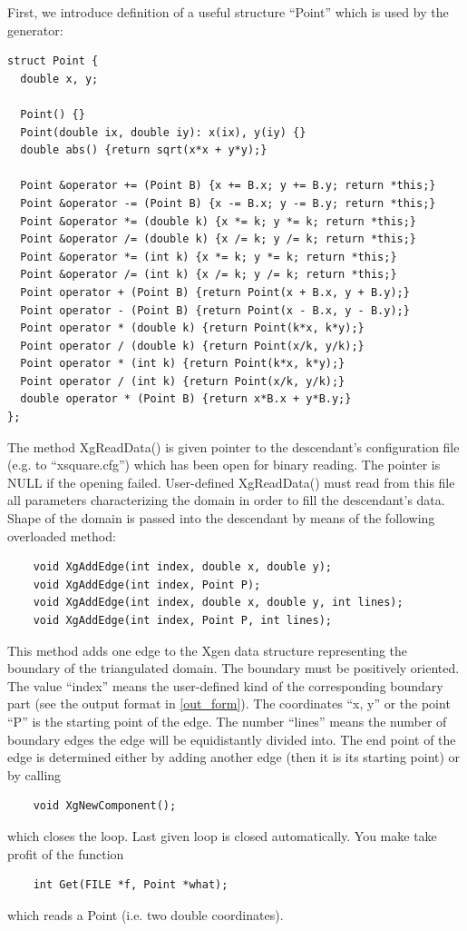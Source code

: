 \documentclass[12pt]{article}
\begin{document}
  First, we introduce definition of a useful structure ``Point'' which is
  used by the generator:
  \begin{verbatim}
struct Point {
  double x, y;

  Point() {}
  Point(double ix, double iy): x(ix), y(iy) {}
  double abs() {return sqrt(x*x + y*y);}

  Point &operator += (Point B) {x += B.x; y += B.y; return *this;}
  Point &operator -= (Point B) {x -= B.x; y -= B.y; return *this;}
  Point &operator *= (double k) {x *= k; y *= k; return *this;}
  Point &operator /= (double k) {x /= k; y /= k; return *this;}
  Point &operator *= (int k) {x *= k; y *= k; return *this;}
  Point &operator /= (int k) {x /= k; y /= k; return *this;}
  Point operator + (Point B) {return Point(x + B.x, y + B.y);}
  Point operator - (Point B) {return Point(x - B.x, y - B.y);}
  Point operator * (double k) {return Point(k*x, k*y);}
  Point operator / (double k) {return Point(x/k, y/k);}
  Point operator * (int k) {return Point(k*x, k*y);}
  Point operator / (int k) {return Point(x/k, y/k);}
  double operator * (Point B) {return x*B.x + y*B.y;}
};
  \end{verbatim}  
  The method XgReadData() is given pointer to the descendant's configuration
  file (e.g. to ``xsquare.cfg'') which has been open for binary reading. The pointer
  is NULL if the opening failed. User-defined XgReadData() must read from this
  file all parameters characterizing the domain in order to fill the descendant's 
  data. Shape of the domain is passed into the descendant by means of the following
  overloaded method:
  \begin{verbatim}
    void XgAddEdge(int index, double x, double y);
    void XgAddEdge(int index, Point P);
    void XgAddEdge(int index, double x, double y, int lines);
    void XgAddEdge(int index, Point P, int lines);
  \end{verbatim}
  This method adds one edge to the Xgen data structure representing the
  boundary of the triangulated domain. The boundary must be positively
  oriented. The value ``index'' means the user-defined kind of the
  corresponding boundary part (see the output format in \ref{out_form}).
  The coordinates ``x, y'' or the point ``P'' is the starting point of the edge.
  The number ``lines'' means the number of boundary edges the edge will be
  equidistantly divided into. The end point of the edge is determined either
  by adding another edge (then it is its starting point) or by calling 
  \begin{verbatim}
    void XgNewComponent();
  \end{verbatim}
  which closes the loop. Last given loop is closed automatically. You make take profit
  of the function
  \begin{verbatim}
    int Get(FILE *f, Point *what);
  \end{verbatim}
  which reads a Point (i.e. two double coordinates).
\end{document}
